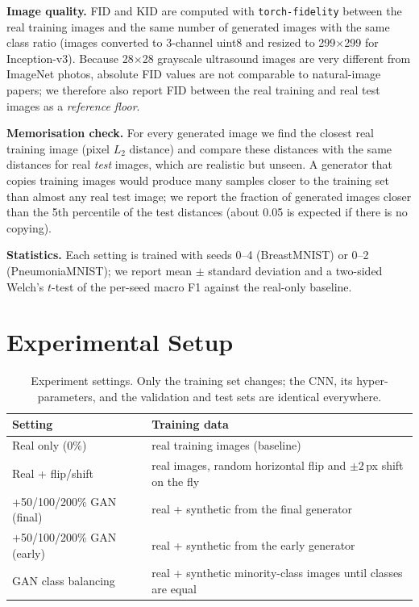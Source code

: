 \textbf{Image quality.} FID and KID are computed with \texttt{torch-fidelity} between the real training images and the
same number of generated images with the same class ratio (images converted to 3-channel uint8 and resized to
299$\times$299 for Inception-v3). Because 28$\times$28 grayscale ultrasound images are very different from ImageNet photos,
absolute FID values are not comparable to natural-image papers; we therefore also report FID between the real training and
real test images as a \emph{reference floor}.

\textbf{Memorisation check.} For every generated image we find the closest real training image (pixel $L_2$ distance) and
compare these distances with the same distances for real \emph{test} images, which are realistic but unseen. A generator
that copies training images would produce many samples closer to the training set than almost any real test image; we
report the fraction of generated images closer than the 5th percentile of the test distances (about 0.05 is expected if
there is no copying).

\textbf{Statistics.} Each setting is trained with seeds 0--4 (BreastMNIST) or 0--2 (PneumoniaMNIST); we report mean
$\pm$ standard deviation and a two-sided Welch's $t$-test of the per-seed macro F1 against the real-only baseline.

\section{Experimental Setup}
\label{sec:settings}
\begin{table}[htbp]
\centering
\caption{Experiment settings. Only the training set changes; the CNN, its hyper-parameters, and the validation and test
sets are identical everywhere.}
\label{tab:settings}
\small
\begin{tabular}{lp{5.2cm}}
\toprule
Setting & Training data \\
\midrule
Real only (0\%) & real training images (baseline) \\
Real + flip/shift & real images, random horizontal flip and $\pm2$\,px shift on the fly \\
+50/100/200\% GAN (final) & real + synthetic from the final generator \\
+50/100/200\% GAN (early) & real + synthetic from the early generator \\
GAN class balancing & real + synthetic minority-class images until classes are equal \\
\bottomrule
\end{tabular}
\end{table}


